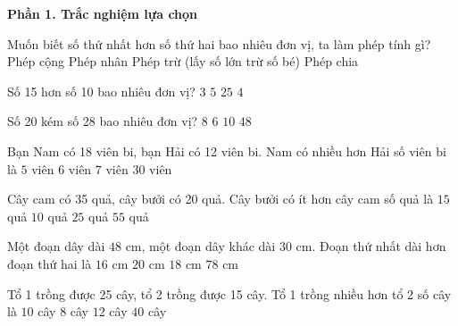 \textbf{Phần 1. Trắc nghiệm lựa chọn}

\begin{ex} %
Muốn biết số thứ nhất hơn số thứ hai bao nhiêu đơn vị, ta làm phép tính gì?
\choice
{Phép cộng}
{Phép nhân}
{\True Phép trừ (lấy số lớn trừ số bé)}
{Phép chia}
\end{ex}

\begin{ex} %
Số 15 hơn số 10 bao nhiêu đơn vị?
\choice
{$3$}
{\True $5$}
{$25$}
{$4$}
\end{ex}

\begin{ex} %
Số 20 kém số 28 bao nhiêu đơn vị?
\choice
{\True $8$}
{$6$}
{$10$}
{$48$}
\end{ex}

\begin{ex} %
Bạn Nam có 18 viên bi, bạn Hải có 12 viên bi. Nam có nhiều hơn Hải số viên bi là
\choice
{$5$ viên}
{\True $6$ viên}
{$7$ viên}
{$30$ viên}
\end{ex}

\begin{ex} %
Cây cam có 35 quả, cây bưởi có 20 quả. Cây bưởi có ít hơn cây cam số quả là
\choice
{\True $15$ quả}
{$10$ quả}
{$25$ quả}
{$55$ quả}
\end{ex}

\begin{ex} %
Một đoạn dây dài $48\text{ cm}$, một đoạn dây khác dài $30\text{ cm}$. Đoạn thứ nhất dài hơn đoạn thứ hai là
\choice
{$16\text{ cm}$}
{$20\text{ cm}$}
{\True $18\text{ cm}$}
{$78\text{ cm}$}
\end{ex}

\begin{ex} %
Tổ 1 trồng được 25 cây, tổ 2 trồng được 15 cây. Tổ 1 trồng nhiều hơn tổ 2 số cây là
\choice
{\True $10$ cây}
{$8$ cây}
{$12$ cây}
{$40$ cây}
\end{ex}

